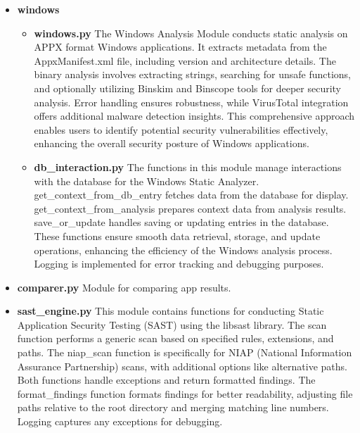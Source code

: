 \documentclass{report}
\begin{document}
\begin{itemize}
\begin{itemize}
                \item \textbf {windows}
                    \begin{itemize}
                        \item \textbf {windows.py}
                        The Windows Analysis Module conducts static analysis on APPX format Windows applications. It extracts metadata from the AppxManifest.xml file, including version and architecture details. The binary analysis involves extracting strings, searching for unsafe functions, and optionally utilizing Binskim and Binscope tools for deeper security analysis. Error handling ensures robustness, while VirusTotal integration offers additional malware detection insights. This comprehensive approach enables users to identify potential security vulnerabilities effectively, enhancing the overall security posture of Windows applications.
                        \item \textbf{db\_interaction.py}
                        The functions in this module manage interactions with the database for the Windows Static Analyzer. get\_context\_from\_db\_entry fetches data from the database for display. get\_context\_from\_analysis prepares context data from analysis results. save\_or\_update handles saving or updating entries in the database. These functions ensure smooth data retrieval, storage, and update operations, enhancing the efficiency of the Windows analysis process. Logging is implemented for error tracking and debugging purposes.
                    \end{itemize}
             \item \textbf {comparer.py}
             Module for comparing app results.
             \item \textbf{sast\_engine.py}
             This module contains functions for conducting Static Application Security Testing (SAST) using the libsast library. The scan function performs a generic scan based on specified rules, extensions, and paths. The niap\_scan function is specifically for NIAP (National Information Assurance Partnership) scans, with additional options like alternative paths. Both functions handle exceptions and return formatted findings. The format\_findings function formats findings for better readability, adjusting file paths relative to the root directory and merging matching line numbers. Logging captures any exceptions for debugging.
            
    \end{itemize}

\end{itemize}
\end{document}
